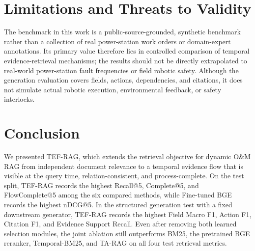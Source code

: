 \section{Limitations and Threats to Validity}
\label{sec:limitations}

The benchmark in this work is a public-source-grounded, 
synthetic benchmark rather than a collection of real 
power-station work orders or domain-expert annotations.
Its primary value therefore lies in controlled comparison of temporal evidence-retrieval mechanisms; the results should not be directly extrapolated to real-world power-station fault frequencies or field robotic safety.
Although the generation evaluation covers fields, actions, dependencies, and citations, it does not simulate actual robotic execution, environmental feedback, or safety interlocks.

\section{Conclusion}
\label{sec:conclusion}

We presented TEF-RAG, which extends the retrieval objective for dynamic O\&M RAG from independent document relevance to a temporal evidence flow that is visible at the query time, relation-consistent, and process-complete.
On the test split, TEF-RAG records the highest Recall@5, Complete@5, and FlowComplete@5 among the six compared methods, while Fine-tuned BGE records the highest nDCG@5. In the structured generation test with a fixed downstream generator, TEF-RAG records the highest Field Macro F1, Action F1, Citation F1, and Evidence Support Recall. Even after removing both learned selection modules, the joint ablation still outperforms BM25, the pretrained BGE reranker, Temporal-BM25, and TA-RAG on all four test retrieval metrics.

